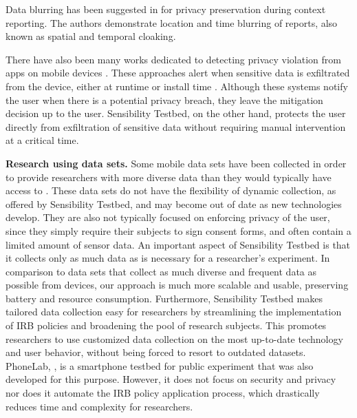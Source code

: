 Data blurring has been suggested in \cite{kapadia2008anonysense} for
privacy preservation during context reporting. The authors demonstrate
location and time blurring of reports, also known as spatial and
temporal cloaking. 

There have also been many works dedicated to detecting privacy
violation from apps on mobile devices \cite{chakraborty2014ipshield,
enck2014taintdroid, holavanalli2013flow}. These approaches alert when
sensitive data is exfiltrated from the device, either at runtime
\cite{chakraborty2014ipshield, enck2014taintdroid} or install time
\cite{holavanalli2013flow}. Although
these systems notify the user when there is a potential privacy
breach, they leave the mitigation decision up to the user. Sensibility
Testbed, on the other hand, protects the user directly from
exfiltration of sensitive data without requiring manual intervention
at a critical time.
 

\textbf{Research using data sets.}
Some mobile data sets have been collected in order to provide
researchers with more diverse data than they would typically have
access to \cite{kiukkonen2010towards, wagner2014device}. These data
sets do not have the flexibility of dynamic collection, as offered by
Sensibility Testbed, and may become out of date as new
technologies develop. They are also not typically focused on enforcing
privacy of the user, since they simply require their subjects to sign
consent forms, and often contain a limited amount of sensor data. 
An important aspect of Sensibility Testbed is that it
collects only as much data as is necessary for a researcher's
experiment. In comparison to data sets that collect as much diverse
and frequent data as possible from devices, our approach is much more
scalable and usable, preserving battery and resource consumption.
Furthermore, Sensibility Testbed makes tailored data collection easy
for researchers by streamlining the implementation of IRB policies and
broadening the pool of research subjects. This promotes researchers to
use customized data collection on the most up-to-date technology and
user behavior, without being forced to resort to outdated datasets.
PhoneLab, \cite{nandugudi2013phonelab}, is a smartphone testbed for
public experiment that was also developed for this purpose. However,
it does not focus on security and privacy nor does it automate the IRB
policy application process, which drastically reduces time and
complexity for researchers.
